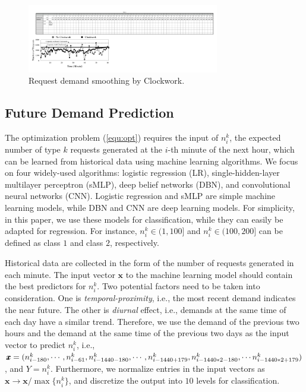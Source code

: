 \begin{figure}[t]
	\center
	\hspace{-0.2cm}
	\includegraphics[trim = 0mm 0mm 0mm 0mm,clip,width=3.3in]{figs/cp1}
	\caption{Request demand smoothing by Clockwork.} \label{fig:serviceplan2}
\end{figure}	

\subsection{Future Demand Prediction}\label{sec:predict}

The optimization problem (\ref{equ:opt}) requires the input of $n_i^k$, the expected number of type $k$ requests generated at the $i$-th minute of the next hour, which can be learned from historical data using machine learning algorithms.  We focus on four widely-used  algorithms: logistic regression (LR), single-hidden-layer multilayer perceptron (sMLP), deep belief networks (DBN), and convolutional neural networks (CNN). Logistic regression and sMLP are simple machine learning models, while DBN and CNN are deep learning models. For simplicity, in this paper, we use these models for classification, while they can easily be adapted for regression. For instance, $n_i^k\in (1,100]$ and $n_i^k \in (100, 200]$ can be defined as class $1$ and class $2$, respectively. 

Historical data are collected in the form of the number of requests generated in each minute. The input vector $\pmb{x}$ to the machine learning model should contain the best predictors for $n_i^k$. Two potential factors need to be taken into consideration. One is \emph{temporal-proximity}, i.e., the most recent demand indicates the near future. The other is \emph{diurnal} effect, i.e., demands at the same time of each day have a similar trend. Therefore, we use the demand of the previous two hours and the demand at the same time of the previous two days as the input vector to predict $n^k_i$, i.e., $\pmb{x}=(n_{i-180}^k,\cdots, n_{i-61}^k, n_{i-1440-180}^k,\cdots,n_{i-1440+179}^k,\\ n_{i-1440*2-180}^k,\cdots n_{i-1440*2+179}^k)$, and $Y= n^k_i$. Furthermore, we normalize entries in the input vectors as $\pmb{x} \rightarrow \pmb{x}/\max\{n_i^k\}$, and discretize the output into $10$ levels for classification.  

